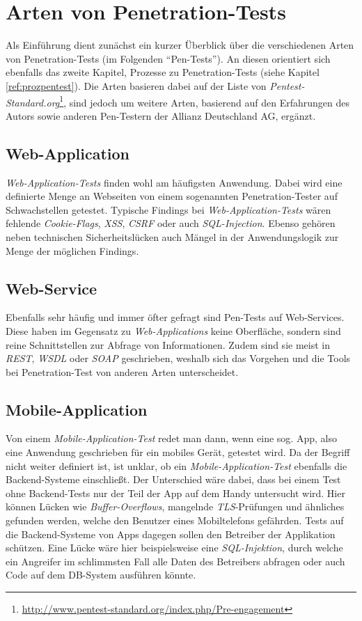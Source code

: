 \chapter{Arten von Penetration-Tests}
Als Einführung dient zunächst ein kurzer Überblick über die verschiedenen Arten von Penetration-Tests (im Folgenden "`Pen-Tests"'). An diesen orientiert sich ebenfalls das zweite Kapitel, Prozesse zu Penetration-Tests (siehe Kapitel \ref{ref:prozpentest}). Die Arten basieren dabei auf der Liste von \textit{Pentest-Standard.org}\footnote{\url{http://www.pentest-standard.org/index.php/Pre-engagement}}, sind jedoch um weitere Arten, basierend auf den Erfahrungen des Autors sowie anderen Pen-Testern der Allianz Deutschland AG, ergänzt.

	\section{Web-Application}
	\textit{Web-Application-Tests} finden wohl am häufigsten Anwendung. Dabei wird eine definierte Menge an Webseiten von einem sogenannten Penetration-Tester auf Schwachstellen getestet. Typische Findings bei \textit{Web-Application-Tests} wären fehlende \textit{Cookie-Flags}, \textit{XSS}, \textit{CSRF} oder auch \textit{SQL-Injection}. Ebenso gehören neben technischen Sicherheitslücken auch Mängel in der Anwendungslogik zur Menge der möglichen Findings.
	
	\section{Web-Service}
	Ebenfalls sehr häufig und immer öfter gefragt sind Pen-Tests auf Web-Services. Diese haben im Gegensatz zu \textit{Web-Applications} keine Oberfläche, sondern sind reine Schnittstellen zur Abfrage von Informationen. Zudem sind sie meist in \textit{REST}, \textit{WSDL} oder \textit{SOAP} geschrieben, weshalb sich das Vorgehen und die Tools bei Penetration-Test von anderen Arten unterscheidet.
	
	\section{Mobile-Application}
	Von einem \textit{Mobile-Application-Test} redet man dann, wenn eine sog. App, also eine Anwendung geschrieben für ein mobiles Gerät, getestet wird. Da der Begriff nicht weiter definiert ist, ist unklar, ob ein \textit{Mobile-Application-Test} ebenfalls die Backend-Systeme einschließt. Der Unterschied wäre dabei, dass bei einem Test ohne Backend-Tests nur der Teil der App auf dem Handy untersucht wird. Hier können Lücken wie \textit{Buffer-Overflows}, mangelnde \textit{TLS}-Prüfungen und ähnliches gefunden werden, welche den Benutzer eines Mobiltelefons gefährden. Tests auf die Backend-Systeme von Apps dagegen sollen den Betreiber der Applikation schützen. Eine Lücke wäre hier beispielsweise eine \textit{SQL-Injektion}, durch welche ein Angreifer im schlimmsten Fall alle Daten des Betreibers abfragen oder auch Code auf dem DB-System ausführen könnte.
	
